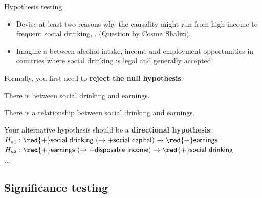 \documentclass{beamer}
\begin{document}


	
	\begin{frame}[t]{Hypothesis testing}

		\begin{itemize}
		\item Devise at least two reasons why the causality might run from high income to frequent social drinking, . (Question by \href{http://www.cscs.umich.edu/~crshalizi/}{Cosma Shalizi}).
		\item Imagine a  between alcohol intake, income and employment opportunities in countries where social drinking is legal and generally accepted.
		\end{itemize}
		
		Formally, you first need to \textbf{reject the null hypothesis}:
		
		 There is  between social drinking and earnings.

		 There is a relationship between social drinking and earnings.\vspace{1em}
		
		Your alternative hypothesis should be a \textbf{directional hypothesis}:\\
		$H_{a1}: \red{+} \textsf{social drinking}~(\rightarrow \textsf{+social capital}) \rightarrow \red{+} \textsf{earnings}$\\
		$H_{a2}: \red{+} \textsf{earnings}~(\rightarrow \textsf{+disposable income}) \rightarrow \red{+} \textsf{social drinking}$\\
		...
	\end{frame}	
	
	\subsection{Significance testing}
	
\end{document}
